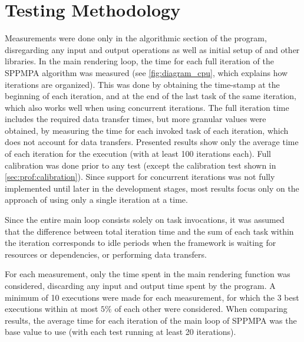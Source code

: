 \documentclass[main.tex]{subfiles}
\begin{document}
\section{Testing Methodology} \label{sec:results:method}


Measurements were done only in the algorithmic section of the program, disregarding any input and output operations as well as initial setup of \starpu and other libraries. In the main rendering loop, the time for each full iteration of the SPPMPA algorithm was measured (see \cref{fig:diagram_cpu}, which explains how iterations are organized). This was done by obtaining the time-stamp at the beginning of each iteration, and at the end of the last task of the same iteration, which also works well when using concurrent iterations. The full iteration time includes the required data transfer times, but more granular values were obtained, by measuring the time for each invoked task of each iteration, which does not account for data transfers. Presented results show only the average time of each iteration for the execution (with at least 100 iterations each). Full calibration was done prior to any \starpu test (except the calibration test shown in \cref{sec:prof:calibration}).
Since support for concurrent iterations was not fully implemented until later in the development stages, most results focus only on the approach of using only a single iteration at a time.

Since the entire main loop consists solely on task invocations, it was assumed that the difference between total iteration time and the sum of each task within the iteration corresponds to idle periods when the framework is waiting for resources or dependencies, or performing data transfers.

For each measurement, only the time spent in the main rendering function was considered, discarding any input and output time spent by the program. A minimum of 10 executions were made for each measurement, for which the 3 best executions within at most $5\%$ of each other were considered. When comparing results, the average time for each iteration of the main loop of SPPMPA was the base value to use (with each test running at least 20 iterations).
\end{document}
